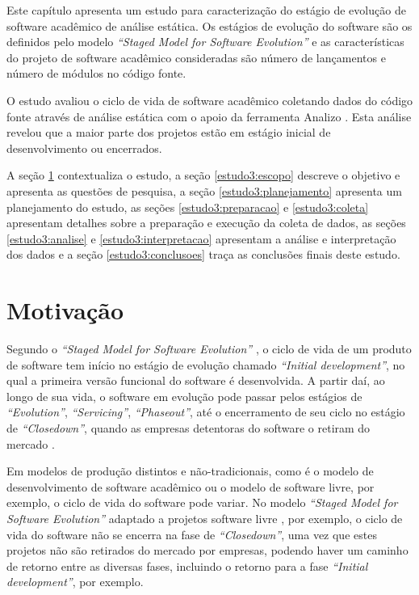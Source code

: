 \label{estudo3}

Este capítulo apresenta
um estudo para caracterização do estágio de evolução de software acadêmico de análise estática.
Os estágios de evolução do software são os definidos pelo modelo 
{\it ``Staged Model for Software Evolution''} \cite{rajlich2000staged}
e as características do projeto de software acadêmico consideradas são 
número de lançamentos e
número de módulos no código fonte.

O estudo avaliou o ciclo de vida de software acadêmico coletando
dados do código fonte através de análise estática com o apoio da
ferramenta Analizo \cite{terceiro2010analizo}.
Esta análise revelou que a maior parte dos projetos
estão em estágio inicial de desenvolvimento ou encerrados.

A seção \ref{estudo3:introducao} contextualiza o estudo,
a seção \ref{estudo3:escopo} descreve o objetivo e apresenta as questões de pesquisa,
a seção \ref{estudo3:planejamento} apresenta um planejamento do estudo,
as seções \ref{estudo3:preparacao} e \ref{estudo3:coleta} apresentam detalhes sobre a preparação e execução da coleta de dados,
as seções \ref{estudo3:analise} e \ref{estudo3:interpretacao} apresentam a análise e interpretação dos dados e
a seção \ref{estudo3:conclusoes} traça as conclusões finais deste estudo.

\section{Motivação} \label{estudo3:introducao} %


Segundo o {\it ``Staged Model for Software Evolution''} \cite{rajlich2000staged},
o ciclo de vida de um produto de software tem início no estágio
de evolução chamado {\it ``Initial development''}, no qual a primeira versão funcional
do software é desenvolvida. A partir daí, ao longo de sua vida,
o software em evolução pode passar pelos estágios de 
{\it``Evolution''}, {\it ``Servicing''}, {\it ``Phaseout''}, até o encerramento de seu ciclo
no estágio de {\it ``Closedown''}, quando as empresas detentoras do
software o retiram do mercado \cite{rajlich2000staged}.

Em modelos de produção distintos e não-tradicionais, como é o modelo de desenvolvimento de
software acadêmico ou o modelo de software livre, por exemplo, o ciclo de vida do software pode
variar. No modelo {\it ``Staged Model for Software Evolution''} adaptado a
projetos software livre \cite{capiluppi2007adapting}, por exemplo, o ciclo de
vida do software não se encerra na fase de {\it ``Closedown''}, uma vez que estes projetos
não são retirados do mercado por empresas, podendo haver um caminho de retorno
entre as diversas fases, incluindo o retorno para a fase {\it
``Initial development''}, por exemplo.

